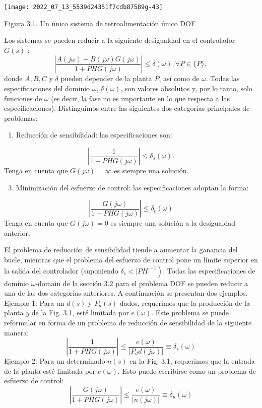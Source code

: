 \texttt{[image: 2022\_07\_13\_5539d24351f7cdb87589g-43]}

Figura 3.1. Un único sistema de retroalimentación único DOF

Los sistemas se pueden reducir a la siguiente desigualdad en el controlador $G(s)$ :
$$
\left|\frac{A(j \omega)+B(j \omega) G(j \omega)}{1+P H G(j \omega)}\right| \leq \delta(\omega), \forall P \in\{P\},
$$
donde $A, B, C$ y $\delta$ pueden depender de la planta $P$, así como de $\omega$. Todas las especificaciones del dominio $\omega$, $\delta(\omega)$, son valores absolutos y, por lo tanto, solo funciones de $\omega$ (es decir, la fase no es importante en lo que respecta a las especificaciones). Distinguimos entre las siguientes dos categorías principales de problemas:

\begin{enumerate}
  \item Reducción de sensibilidad: las especificaciones son:
\end{enumerate}
$$
\left|\frac{1}{1+P H G(j \omega)}\right| \leq \delta_{s}(\omega) .
$$
Tenga en cuenta que $G(j \omega)=\infty$ es siempre una solución.

\begin{enumerate}
  \setcounter{enumi}{2}
  \item Minimización del esfuerzo de control: las especificaciones adoptan la forma:
\end{enumerate}
$$
\left|\frac{G(j \omega)}{1+P H G(j \omega)}\right| \leq \delta_{c}(\omega)
$$
Tenga en cuenta que $G(j \omega)=0$ es siempre una solución a la desigualdad anterior.

El problema de reducción de sensibilidad tiende a aumentar la ganancia del bucle, mientras que el problema del esfuerzo de control pone un límite superior en la salida del controlador (suponiendo $\left.\delta_{c}<|P H|^{-1}\right)$. Todas las especificaciones de dominio $\omega$-domain de la sección $3.2$ para el problema DOF se pueden reducir a una de las dos categorías anteriores. A continuación se presentan dos ejemplos. Ejemplo 1: Para un $d(s)$ y $P_{d}(s)$ dados, requerimos que la producción de la planta $y$ de la Fig. 3.1, esté limitada por $e(\omega)$. Este problema se puede reformular en forma de un problema de reducción de sensibilidad de la siguiente manera:
$$
\left|\frac{1}{1+P H G(j \omega)}\right| \leq \frac{e(\omega)}{\left| P_{d} d(j \omega)\right|} \equiv \delta_{s}(\omega)
$$
Ejemplo 2: Para un determinado $n(s)$ en la Fig. 3.1, requerimos que la entrada de la planta esté limitada por $e(\omega)$. Esto puede escribirse como un problema de esfuerzo de control:
$$
\left|\frac{G(j \omega)}{1+P H G(j \omega)}\right| \leq \frac{e(\omega)}{|n(j \omega)|} \equiv \delta_{u}(\omega)
$$

